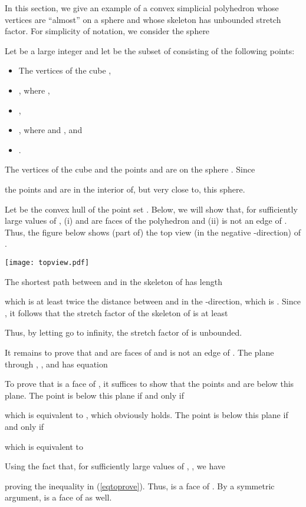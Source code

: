 \documentclass[12pt]{article}
\begin{document}
In this section, we give an example of a convex simplicial polyhedron 
whose vertices are ``almost'' on a sphere and whose skeleton has 
unbounded stretch factor. For simplicity of notation, we consider the 
sphere 
 
Let  be a large integer and let  be the subset of  
consisting of the following  points:
\begin{itemize}
\item The  vertices of the cube ,
\item , where ,
\item ,
\item , where  and , and 
\item .
\end{itemize}
The  vertices of the cube and the points  and  are on the
sphere . Since  

the points  and  are in the interior of, but very close to, this 
sphere.

Let  be the convex hull of the point set . Below, we will 
show that, for sufficiently large values of , 
(i)  and  are faces of the polyhedron  and 
(ii)  is not an edge of . Thus, the figure below shows (part of) 
the top view (in the negative -direction) of .

\begin{center}
   \texttt{[image: topview.pdf]}
\end{center}

The shortest path between  and  in the skeleton of  has 
length

which is at least twice the distance between  and  in the
-direction, which is . Since , it follows that
the stretch factor of the skeleton of  is at least

Thus, by letting  go to infinity, the stretch factor of  
is unbounded.

It remains to prove that  and  are faces of  and  
 is not an edge of . The plane through , , and  has 
equation

To prove that  is a face of , it suffices to show that the 
points  and  are below this plane. The point  is below 
this plane if and only if 

which is equivalent to , which obviously holds. The point  
is below this plane if and only if 

which is equivalent to

Using the fact that, for sufficiently large values of , ,
we have

proving the inequality in (\ref{eqtoprove}). Thus,  is a face 
of . By a symmetric argument,  is a face of  as well. 
\end{document}
